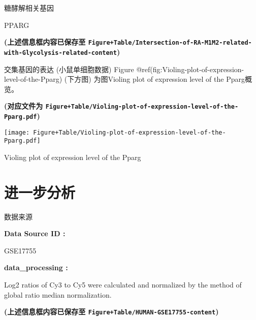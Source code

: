 \documentclass[
  ignorenonframetext,
]{beamer}
\begin{document}
\begin{frame}[fragile]{糖酵解相关基因}
\begin{center}
\begin{tcolorbox}[colback=gray!10, colframe=gray!50, width=0.9\linewidth, arc=1mm, boxrule=0.5pt]
\vspace{0.5em}

    PPARG

\vspace{2em}
\end{tcolorbox}
\end{center}

\textbf{(上述信息框内容已保存至
\texttt{Figure+Table/Intersection-of-RA-M1M2-related-with-Glycolysis-related-content})}
\end{frame}

\begin{frame}[fragile]{交集基因的表达 (小鼠单细胞数据)}
\protect\hypertarget{ux4ea4ux96c6ux57faux56e0ux7684ux8868ux8fbe-ux5c0fux9f20ux5355ux7ec6ux80deux6570ux636e}{}
Figure @ref(fig:Violing-plot-of-expression-level-of-the-Pparg) (下方图)
为图Violing plot of expression level of the Pparg概览。

\textbf{(对应文件为
\texttt{Figure+Table/Violing-plot-of-expression-level-of-the-Pparg.pdf})}

\def\@captype{figure}
\begin{center}
\texttt{[image: Figure+Table/Violing-plot-of-expression-level-of-the-Pparg.pdf]}
\caption{Violing plot of expression level of the Pparg}\label{fig:Violing-plot-of-expression-level-of-the-Pparg}
\end{center}
\end{frame}

\hypertarget{ux8fdbux4e00ux6b65ux5206ux6790}{%
\section{进一步分析}\label{ux8fdbux4e00ux6b65ux5206ux6790}}

\begin{frame}[fragile]{数据来源}
\protect\hypertarget{ux6570ux636eux6765ux6e90-1}{}
\begin{center}\begin{tcolorbox}[colback=gray!10, colframe=gray!50, width=0.9\linewidth, arc=1mm, boxrule=0.5pt]
\textbf{
Data Source ID
:}

\vspace{0.5em}

    GSE17755

\vspace{2em}


\textbf{
data\_processing
:}

\vspace{0.5em}

    Log2 ratios of Cy3 to Cy5 were calculated and
normalized by the method of global ratio median
normalization.

\vspace{2em}
\end{tcolorbox}
\end{center}

\textbf{(上述信息框内容已保存至
\texttt{Figure+Table/HUMAN-GSE17755-content})}
\end{frame}
\end{document}
